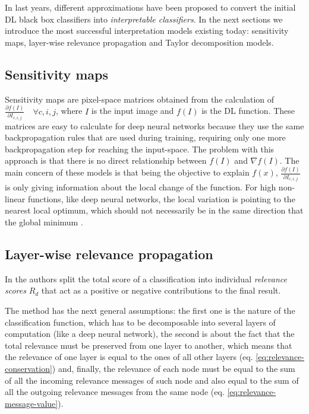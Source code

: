 \documentclass[review]{elsarticle}
\theoremstyle{definition} %
\theoremstyle{remark}
\begin{document}
In last years, different approximations have been proposed to convert the initial DL black box classifiers into \emph{interpretable classifiers}. In the next sections we introduce the most successful interpretation models existing today: sensitivity maps, layer-wise relevance propagation and Taylor decomposition models. 

\subsection{Sensitivity maps}

Sensitivity maps \cite{DBLP:journals/corr/SimonyanVZ13} are pixel-space matrices obtained from the calculation of $ \frac{\partial f(I)}{\partial I_{c,i,j}} \quad \forall c,i,j$, where $I$ is the input image and $f(I)$ is the DL function. These matrices are easy to calculate for deep neural networks because they use the same backpropagation rules that are used during training, requiring only one more backpropagation step for reaching the input-space. The problem with this approach is that there is no direct relationship between $f(I)$ and $\nabla f(I)$. The main concern of these models is that being the objective to explain $f(x)$, $ \frac{\partial f(I)}{\partial I_{c,i,j}}$ is only giving information about the local change of the function. For high non-linear functions, like deep neural networks, the local variation is pointing to the nearest local optimum, which should not necessarily be in the same direction that the global minimum \cite{baehrens2010explain}.


\subsection{Layer-wise relevance propagation} 

In \cite{bach2015pixel} the authors split the total score of a classification into individual \emph{relevance scores} $R_d$ that act as a positive or negative contributions to the final result. 

The method has the next general assumptions: the first one is the nature of the classification function, which has to be decomposable into several layers of computation (like a deep neural network), the second is about the fact that the total relevance must be preserved from one layer to another, which means that the relevance of one layer is equal to the ones of all other layers (eq. \ref{eq:relevance-conservation}) and, finally, the relevance of each node must be equal to the sum of all the incoming relevance messages of such node and also equal to the sum of all the outgoing relevance messages from the same node (eq. \ref{eq:relevance-message-value}).
\end{document}
